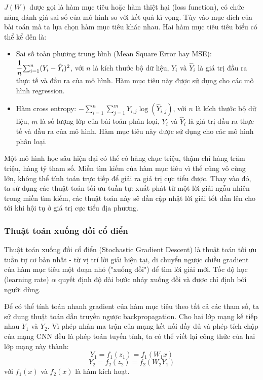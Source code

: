 \documentclass[12pt]{extreport}
\begin{document}
$ J(W) $ được gọi là hàm mục tiêu hoặc hàm thiệt hại (loss function), có chức năng đánh giá sai số của mô hình so với kết quả kì vọng. Tùy vào mục đích của bài toán mà ta lựa chọn hàm mục tiêu khác nhau. Hai hàm mục tiêu tiêu biểu có thể kể đến là:
\begin{itemize}
    \item Sai số toàn phương trung bình (Mean Square Error hay MSE): $ \cfrac{1}{n} \sum_{i=1}^{n} (Y_i - \hat{Y}_i)^2 $, với $ n $ là kích thước bộ dữ liệu, $ Y_i $ và $ \hat{Y}_i $ là giá trị đầu ra thực tế và đầu ra của mô hình. Hàm mục tiêu này được sử dụng cho các mô hình regression.
    \item Hàm cross entropy: $ - \sum_{i=1}^{n} \sum_{j=1}^{m} Y_{i, j} \log(\hat{Y}_{i, j}) $, với $ n $ là kích thước bộ dữ liệu, $ m $ là số lượng lớp của bài toán phân loại, $ Y_i $ và $ \hat{Y}_i $ là giá trị đầu ra thực tế và đầu ra của mô hình. Hàm mục tiêu này được sử dụng cho các mô hình phân loại.
\end{itemize}

Một mô hình học sâu hiện đại có thể có hàng chục triệu, thậm chí hàng trăm triệu, hàng tỷ tham số. Miền tìm kiếm của hàm mục tiêu vì thế cũng vô cùng lớn, không thể tính toán trực tiếp để giải ra giá trị cực tiểu được. Thay vào đó, ta sử dụng các thuật toán tối ưu tuần tự: xuất phát từ một lời giải ngẫu nhiên trong miền tìm kiếm, các thuật toán này sẽ dần cập nhật lời giải tốt dần lên cho tới khi hội tụ ở giá trị cực tiểu địa phương.

\subsubsection{Thuật toán xuống đồi cổ điển}

Thuật toán xuống đồi cổ điển (Stochastic Gradient Descent) là thuật toán tối ưu tuần tự cơ bản nhất - từ vị trí lời giải hiện tại, di chuyển ngược chiều gradient của hàm mục tiêu một đoạn nhỏ ("xuống đồi") để tìm lời giải mới. Tốc độ học (learning rate) $ \alpha $ quyết định độ dài bước nhảy xuống đồi và được chỉ định bởi người dùng.

Để có thể tính toán nhanh gradient của hàm mục tiêu theo tất cả các tham số, ta sử dụng thuật toán dẫn truyền ngược backpropagation. Cho hai lớp mạng kế tiếp nhau $ Y_1 $ và $ Y_2 $. Vì phép nhân ma trận của mạng kết nối đầy đủ và phép tích chập của mạng CNN đều là phép toán tuyến tính, ta có thể viết lại công thức của hai lớp mạng này thành:
$$ Y_1 = f_1(z_1) = f_1(W_1x) $$
$$ Y_2 = f_2(z_2) = f_2(W_2Y_1) $$
với $ f_1(x) $ và $ f_2(x) $ là hàm kích hoạt.
\end{document}
